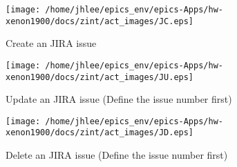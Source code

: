 \noindent
\vspace{1.4cm}
\begin{minipage}{.2\textwidth}
\begin{center}
\texttt{[image: /home/jhlee/epics\_env/epics-Apps/hw-xenon1900/docs/zint/act\_images/JC.eps]}
\end{center}
\end{minipage}
\begin{minipage}{.7\textwidth}
Create an JIRA issue 
\end{minipage}


\noindent
\vspace{1.4cm}
\begin{minipage}{.2\textwidth}
\begin{center}
\texttt{[image: /home/jhlee/epics\_env/epics-Apps/hw-xenon1900/docs/zint/act\_images/JU.eps]}
\end{center}
\end{minipage}
\begin{minipage}{.7\textwidth}
Update an JIRA issue (Define the issue number first)
\end{minipage}


\noindent
\vspace{1.4cm}
\begin{minipage}{.2\textwidth}
\begin{center}
\texttt{[image: /home/jhlee/epics\_env/epics-Apps/hw-xenon1900/docs/zint/act\_images/JD.eps]}
\end{center}
\end{minipage}
\begin{minipage}{.7\textwidth}
Delete an JIRA issue (Define the issue number first)
\end{minipage}


